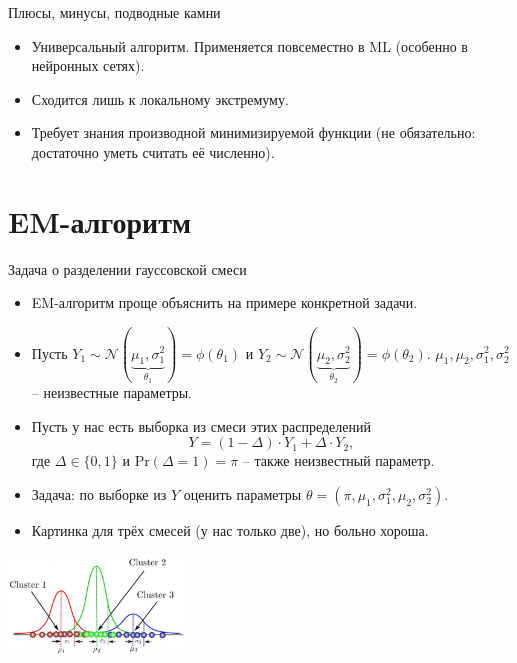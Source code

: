\documentclass[9pt]{beamer}
\begin{document}
\begin{frame}{Плюсы, минусы, подводные камни}
\begin{itemize}
    \item Универсальный алгоритм. Применяется повсеместно в ML (особенно в нейронных сетях).
    \item Сходится лишь к локальному экстремуму.
    \item Требует знания производной минимизируемой функции (не обязательно: достаточно уметь считать её численно).
\end{itemize}
    
\end{frame}
\section{EM-алгоритм}
\begin{frame}{Задача о разделении гауссовской смеси}
\begin{itemize}
    \item EM-алгоритм проще объяснить на примере конкретной задачи.
    \item Пусть $Y_1 \sim \mathcal{N}(\underbrace{\mu_1, \sigma_1^2}_{\theta_1}) = \phi(\theta_1)$ и $Y_2 \sim \mathcal{N}(\underbrace{\mu_2, \sigma_2^2}_{\theta_2}) = \phi(\theta_2)$.\newline
    $\mu_1, \mu_2, \sigma_1^2, \sigma_2^2$ -- неизвестные параметры.
    \item Пусть у нас есть выборка из смеси этих распределений $$Y = (1-\Delta)\cdot Y_1 + \Delta\cdot Y_2,$$ где $\Delta \in \{0, 1\}$ и $\text{Pr}(\Delta = 1) = \pi$ -- также неизвестный параметр.  
    \item Задача: по выборке из $Y$ оценить параметры $\theta=(\pi, \mu_1, \sigma_1^2, \mu_2, \sigma_2^2)$.
    \item Картинка для трёх смесей (у нас только две), но больно  хороша.
\end{itemize}
\begin{center}\includegraphics[height=100px]{img/gaussian_mixture_em.jpg}\end{center}
\end{frame}
\end{document}
